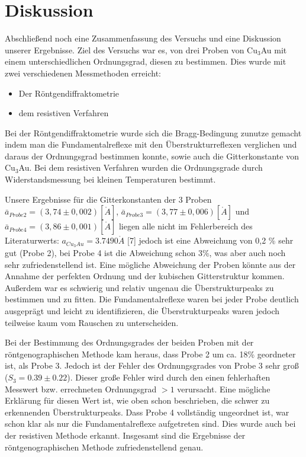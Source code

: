 \section{Diskussion}
    Abschließend noch eine Zusammenfassung des Versuchs und eine Diskussion
    unserer Ergebnisse.
    Ziel des Versuchs war es, von drei Proben von Cu$_3$Au mit einem
    unterschiedlichen Ordnungsgrad, diesen zu bestimmen. 
    Dies wurde mit zwei verschiedenen Messmethoden erreicht: 
    \begin{itemize}
        \item Der Röntgendiffraktometrie
        \item dem resistiven Verfahren
    \end{itemize}
    Bei der Röntgendiffraktometrie wurde sich die Bragg-Bedingung zunutze gemacht
    indem man die Fundamentalreflexe mit den Überstrukturreflexen verglichen und 
    daraus der Ordnungsgrad bestimmen konnte, sowie auch die Gitterkonstante
    von Cu$_3$Au. Bei dem resistiven Verfahren wurden die Ordnungsgrade 
    durch Widerstandsmessung bei kleinen Temperaturen bestimmt.

    Unsere Ergebnisse für die Gitterkonstanten der 3 Proben $\bar{a}_{Probe2} = (3,74 \pm 0,002)[\mathring{A}]$,
    $\bar{a}_{Probe3} = (3,77 \pm 0,006)[\mathring{A}]$ und $\bar{a}_{Probe4} = (3,86 \pm 0,001)[\mathring{A}]$ liegen
    alle nicht im Fehlerbereich des Literaturwerts: $a_{Cu_3Au} = 3.7490\mathring{A}$ [7]
    jedoch ist eine Abweichung von 0,2 \% sehr gut (Probe 2), bei Probe 4 ist die Abweichung schon 3\%, was aber 
    auch noch sehr zufriedenstellend ist. Eine mögliche Abweichung der Proben könnte aus der Annahme der perfekten Ordnung und der kubischen Gitterstruktur kommen. Außerdem war es schwierig und relativ ungenau die Überstrukturpeaks zu bestimmen und zu fitten.
    Die Fundamentalreflexe waren bei jeder Probe deutlich ausgeprägt und leicht zu identifizieren, die Überstrukturpeaks 
    waren jedoch teilweise kaum vom Rauschen zu unterscheiden.
    
    Bei der Bestimmung des Ordnungsgrades der beiden Proben mit der röntgenographischen Methode kam heraus, 
    dass Probe 2 um ca. 18\% geordneter ist, als Probe 3. Jedoch ist der Fehler des Ordnungsgrades von Probe 3 sehr groß ($S_3= 0.39\pm 0.22$).
    Dieser große Fehler wird durch den einen fehlerhaften Messwert bzw. errechneten Ordnungsgrad $>1$ verursacht.
    Eine mögliche Erklärung für diesen Wert ist, wie oben schon beschrieben, die schwer zu erkennenden Überstrukturpeaks.
    Dass Probe 4 vollständig ungeordnet ist, war schon klar als nur die Fundamentalreflexe aufgetreten sind. Dies wurde
    auch bei der resistiven Methode erkannt. Insgesamt sind die Ergebnisse der röntgenographischen Methode
    zufriedenstellend genau.

